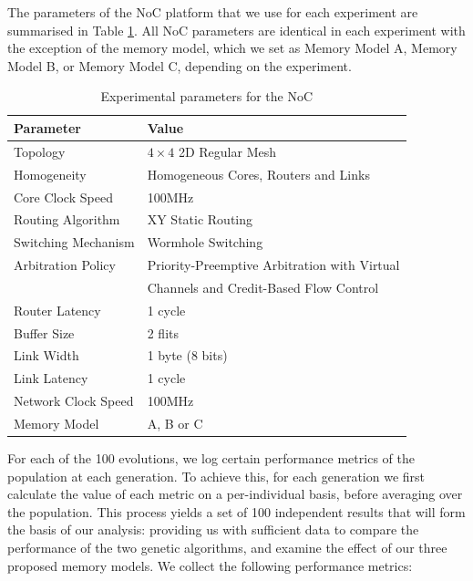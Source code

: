 \documentclass[conference]{IEEEtran}
\begin{document}
The parameters of the NoC platform that we use for each experiment are summarised in Table \ref{table:noc_config}. All NoC parameters are identical in each experiment with the exception of the memory model, which we set as Memory Model A, Memory Model B, or Memory Model C, depending on the experiment.
\vspace{-4ex}	
	
	\begin{table}[h!] \centering
		\caption{Experimental parameters for the NoC}
		\footnotesize\begin{tabularx}{0.48\textwidth}{ll}
			\toprule
			Parameter & Value \\
			\midrule
			Topology & $4\times4$ 2D Regular Mesh \\
			Homogeneity & Homogeneous Cores, Routers and Links \\
			Core Clock Speed & 100MHz \\
			Routing Algorithm & XY Static Routing \\
			Switching Mechanism & Wormhole Switching \\
			Arbitration Policy & Priority-Preemptive Arbitration with Virtual \\ &  Channels and Credit-Based Flow Control \\
			Router Latency & 1 cycle \\
			Buffer Size & 2 flits \\
			Link Width & 1 byte (8 bits) \\
			Link Latency & 1 cycle \\
			Network Clock Speed & 100MHz \\
			Memory Model & A, B or C \\
			\bottomrule
		\end{tabularx}
	
		\label{table:noc_config}
	\end{table}
\vspace{-1ex}	

For each of the 100 evolutions, we log certain performance metrics of the population at each generation. To achieve this, for each generation we first calculate the value of each metric on a per-individual basis, before averaging over the population. This process yields a set of 100 independent results that will form the basis of our analysis: providing us with sufficient data to compare the performance of the two genetic algorithms, and examine the effect of our three proposed memory models. We collect the following performance metrics:
\end{document}
